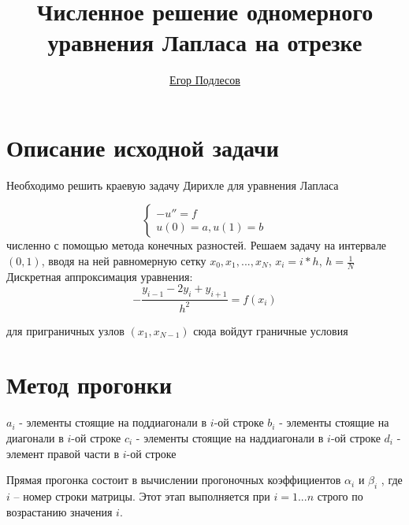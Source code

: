 \documentclass[a4paper,12pt]{report}
\author{\href{https://github.com/ypodlesov}{Егор Подлесов}}
\title{\textbf{Численное решение одномерного уравнения Лапласа на отрезке}}
\begin{document}
    \maketitle
    \clearpage

    \section*{Описание исходной задачи}

    Необходимо решить краевую задачу Дирихле для уравнения Лапласа
    
    \begin{equation*}
     \begin{cases}
       -u'' = f\\
       u(0) = a, u(1) = b 
     \end{cases}
    \end{equation*}
    численно с помощью метода конечных разностей.
    \newline
    Решаем задачу на интервале $(0, 1)$, вводя на ней равномерную сетку $x_0, x_1, ..., x_N$,
    $x_i = i * h$,
    $h = \frac{1}{N}$
    Дискретная аппроксимация уравнения:
    $$-\frac{y_{i-1}-2y_i+y_{i+1}}{h^{2}} = f(x_i)$$
    
    для приграничных узлов $(x_1, x_{N-1})$
    сюда войдут граничные условия
    
    \section*{Метод прогонки}
    
    $a_i$ - элементы стоящие на поддиагонали в $i$-ой строке
    \newline
    $b_i$ - элементы стоящие на диагонали в $i$-ой строке
    \newline
    $c_i$ - элементы стоящие на наддиагонали в $i$-ой строке
    \newline
    $d_i$ - элемент правой части в $i$-ой строке
    \newline
    
    Прямая прогонка состоит в вычислении прогоночных коэффициентов $\alpha_i$ и $\beta_i$ , где $i$ – номер строки матрицы. Этот этап выполняется при $i = 1...n$ строго по возрастанию значения $i$.
\end{document}
